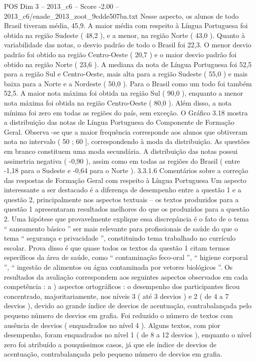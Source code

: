 \begin{textsample}{POS Dim 3 – 2013\_c6 – Score -2.00 – 2013\_c6/enade\_2013\_zoot\_9cdde507ba.txt}
Nesse aspecto, os alunos de todo Brasil tiveram média, 45,9.
A maior média com respeito à Língua Portuguesa foi obtida na região Sudeste ( 48,2 ), e a menor, na região Norte ( 43,0 ).
Quanto à variabilidade das notas, o desvio padrão de todo o Brasil foi 22,3.
O menor desvio padrão foi obtido na região Centro-Oeste ( 20,7 ) e o maior desvio padrão foi obtido na região Norte ( 23,6 ).
A mediana da nota de Língua Portuguesa foi 52,5 para a região Sul e Centro-Oeste, mais alta para a região Sudeste ( 55,0 ) e mais baixa para a Norte e a Nordeste ( 50,0 ).
Para o Brasil como um todo foi também 52,5.
A maior nota máxima foi obtida na região Sul ( 90,0 ), enquanto a menor nota máxima foi obtida na região Centro-Oeste ( 80,0 ).
Além disso, a nota mínima foi zero em todas as regiões do país, sem exceção.
O Gráfico 3.18 mostra a distribuição das notas de Língua Portuguesa do Componente de Formação Geral.
Observa -se que a maior frequência corresponde aos alunos que obtiveram nota no intervalo ( 50 ; 60 ], correspondendo à moda da distribuição.
As questões em branco constituem uma moda secundária.
A distribuição das notas possui assimetria negativa ( -0,90 ), assim como em todas as regiões do Brasil ( entre -1,18 para o Sudeste e -0,64 para o Norte ). 3.3.1.6 Comentários sobre a correção das respostas de Formação Geral com respeito à Língua Portuguesa Um aspecto interessante a ser destacado é a diferença de desempenho entre a questão 1 e a questão 2, principalmente nos aspectos textuais – os textos produzidos para a questão 1 apresentaram resultados melhores do que os produzidos para a questão 2.
Uma hipótese que provavelmente explique essa discrepância é o fato de o tema “ saneamento básico ” ser mais relevante para profissionais de saúde do que o tema “ segurança e privacidade ”, constituindo tema trabalhado no currículo escolar.
Prova disso é que quase todos os textos da questão 1 citam termos específicos da área de saúde, como “ contaminação feco-oral ”, “ higiene corporal ”, “ ingestão de alimentos ou água contaminada por vetores biológicos ”.
Os resultados da avaliação correspondem aos seguintes aspectos observados em cada competência : a ) aspectos ortográficos : o desempenho dos participantes ficou concentrado, majoritariamente, nos níveis 3 ( até 3 desvios ) e 2 ( de 4 a 7 desvios ), devido ao grande índice de desvios de acentuação, contrabalançada pelo pequeno número de desvios em grafia.
Foi reduzido o número de textos com ausência de desvios ( enquadrados no nível 4 ).
Alguns textos, com pior desempenho, foram enquadrados no nível 1 ( de 8 a 12 desvios ), enquanto o nível zero foi atribuído a pouquíssimos casos, já que ele índice de desvios de acentuação, contrabalançada pelo pequeno número de desvios em grafia.

\end{textsample}
